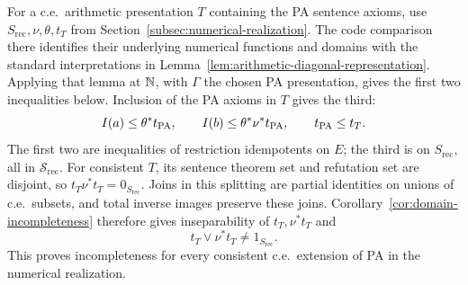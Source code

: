 For a c.e.\ arithmetic presentation $T$ containing the PA sentence
axioms, use $S_{\mathrm{rec}},\nu,\theta,t_T$ from
Section~\ref{subsec:numerical-realization}. The code comparison there
identifies their underlying numerical functions and domains with
the standard interpretations in
Lemma~\ref{lem:arithmetic-diagonal-representation}. Applying that
lemma at $\mathbb N$, with $\Gamma$ the chosen PA presentation, gives
the first two inequalities below. Inclusion of the PA axioms in
$T$ gives the third:
\begin{equation}\label{eq:arithmetic-domain-inclusions}
 I(a)\le\theta^*t_{\mathrm{PA}},\qquad
 I(b)\le\theta^*\nu^*t_{\mathrm{PA}},\qquad t_{\mathrm{PA}}\le t_T.
\end{equation}
The first two are inequalities of restriction idempotents on $E$;
the third is on $S_{\mathrm{rec}}$, all in
$\mathscr S_{\mathrm{rec}}$.
For consistent $T$, its sentence theorem set and refutation set
are disjoint, so $t_T\nu^*t_T=0_{S_{\mathrm{rec}}}$.
Joins in this splitting are partial identities on unions of c.e.\ subsets,
and total inverse images preserve these joins. Corollary~\ref{cor:domain-incompleteness}
therefore gives inseparability of $t_T,\nu^*t_T$ and
\[
 t_T\vee\nu^*t_T\ne1_{S_{\mathrm{rec}}}.
\]
This proves incompleteness for every consistent c.e.\ extension
of PA in the numerical realization.
